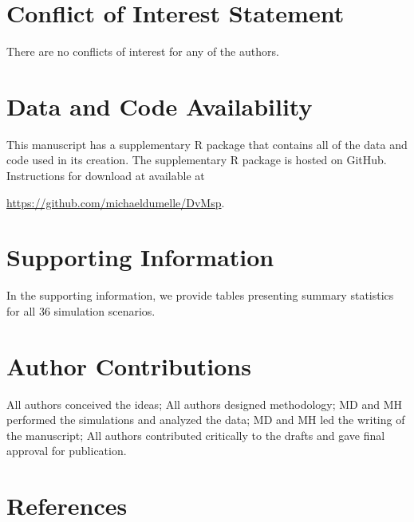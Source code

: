 \documentclass[]{elsarticle} %
\begin{document}
\hypertarget{conflict-of-interest-statement}{%
\section*{Conflict of Interest
Statement}\label{conflict-of-interest-statement}}

There are no conflicts of interest for any of the authors.

\hypertarget{data-and-code-availability}{%
\section*{Data and Code Availability}\label{data-and-code-availability}}

This manuscript has a supplementary R package that contains all of the
data and code used in its creation. The supplementary R package is
hosted on GitHub. Instructions for download at available at

\url{https://github.com/michaeldumelle/DvMsp}.

\hypertarget{supporting-information}{%
\section*{Supporting Information}\label{supporting-information}}

In the supporting information, we provide tables presenting summary
statistics for all 36 simulation scenarios.

\hypertarget{author-contributions}{%
\section*{Author Contributions}\label{author-contributions}}

All authors conceived the ideas; All authors designed methodology; MD
and MH performed the simulations and analyzed the data; MD and MH led
the writing of the manuscript; All authors contributed critically to the
drafts and gave final approval for publication.

\hypertarget{references}{%
\section*{References}\label{references}}
\end{document}

